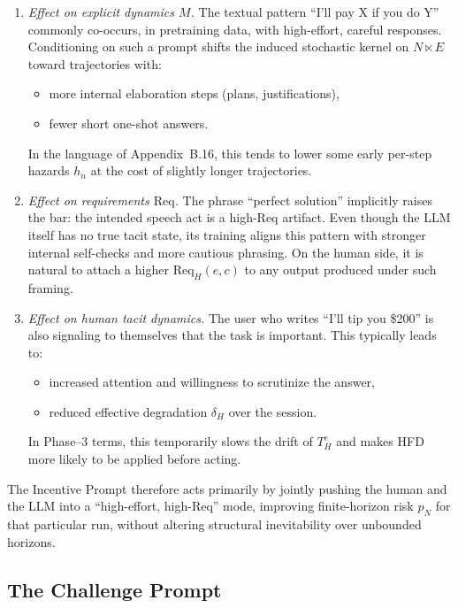 \begin{enumerate}
  \item \emph{Effect on explicit dynamics $M$.} The textual pattern
    ``I'll pay X if you do Y'' commonly co-occurs, in pretraining data,
    with high-effort, careful responses. Conditioning on such a prompt
    shifts the induced stochastic kernel on $N \ltimes E$ toward trajectories
    with:
    \begin{itemize}
      \item more internal elaboration steps (plans, justifications),
      \item fewer short one-shot answers.
    \end{itemize}
    In the language of Appendix~B.16, this tends to lower some early
    per-step hazards $h_n$ at the cost of slightly longer trajectories.

  \item \emph{Effect on requirements $\mathrm{Req}$.} The phrase ``perfect
    solution'' implicitly raises the bar: the intended speech act is a
    high-Req artifact. Even though the LLM itself has no true tacit state,
    its training aligns this pattern with stronger internal self-checks
    and more cautious phrasing. On the human side, it is natural to attach
    a higher $\mathrm{Req}_H(e,c)$ to any output produced under such
    framing.

  \item \emph{Effect on human tacit dynamics.} The user who writes
    ``I'll tip you \$200'' is also signaling to themselves that the task is
    important. This typically leads to:
    \begin{itemize}
      \item increased attention and willingness to scrutinize the answer,
      \item reduced effective degradation $\delta_H$ over the session.
    \end{itemize}
    In Phase--3 terms, this temporarily slows the drift of $T^e_H$ and
    makes HFD more likely to be applied before acting.
\end{enumerate}

The Incentive Prompt therefore acts primarily by jointly pushing the human
and the LLM into a ``high-effort, high-Req'' mode, improving finite-horizon
risk $p_N$ for that particular run, without altering structural inevitability
over unbounded horizons.

\subsection{The Challenge Prompt}

